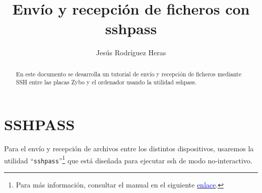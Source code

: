 \documentclass[12pt,letterpaper]{article}
\title{Envío y recepción de ficheros con sshpass}
\author{Jesús Rodríguez Heras}
\begin{document}
	
	\maketitle
	\begin{abstract} %
		\begin{center}
			En este documento se desarrolla un tutorial de envío y recepción de ficheros mediante SSH entre las placas Zybo y el ordenador usando la utilidad sshpass.
		\end{center}
	\end{abstract}
	\thispagestyle{empty}
	\newpage
	
	\tableofcontents
	\newpage
	
	
	
	
	\lstset{language=bash, numbers=left, numberstyle=\tiny, numbersep=10pt, firstnumber=1, stepnumber=1, basicstyle=\small\ttfamily, tabsize=1, extendedchars=true, inputencoding=latin1}
	

\section{SSHPASS}
Para el envío y recepción de archivos entre los distintos dispositivos, usaremos la utilidad ``\texttt{sshpass}''\footnote{Para  más información, consultar el manual en el siguiente \href{https://linux.die.net/man/1/sshpass}{\textcolor{blue}{enlace}}.} que está diseñada para ejecutar ssh de modo no-interactivo.	
	
\end{document}
